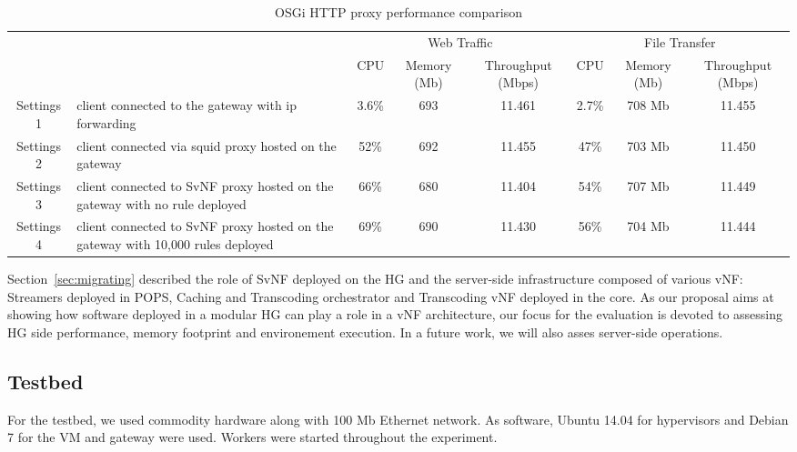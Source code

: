 \begin{table*}
	\centering
	\begin{tabular}{| c | p{}|c |c |c || c |c |c |}
	
	
 	    \multicolumn{2}{c}{} & \multicolumn{3}{c}{Web Traffic} 		  & \multicolumn{3}{c}{File Transfer} \\
 	     \cline{3-8}	
             \multicolumn{2}{c|}{} & CPU 			& Memory (Mb) 		& Throughput (Mbps)	& CPU 		& Memory (Mb)		& Throughput (Mbps) \\\hline   
Settings 1 & client connected to the gateway with ip forwarding &   3.6\% 		& 693 		& 11.461		& 2.7\%		& 708 Mb		& 11.455 \\\hline
Settings 2 & client connected via squid proxy hosted on the gateway   &   52\%        & 692 		& 11.455		& 47\%		& 703 Mb		& 11.450 \\\hline
Settings 3 & client connected to SvNF proxy hosted on the gateway with no rule deployed &   66\%		& 680 		& 11.404		& 54\%		& 707 Mb		& 11.449 \\\hline
Settings 4 & client connected to SvNF proxy hosted on the gateway with 10,000 rules deployed   &   69\%        & 690 		& 11.430		& 56\%		& 704 Mb		& 11.444 \\\hline

	
	
	            
	\end{tabular}
	\caption{
	OSGi HTTP proxy performance comparison
	\label{tab:perf-comparison}
	}
	
\end{table*}

Section~\ref{sec:migrating} described the role of SvNF deployed on the HG and the server-side infrastructure composed of various vNF: Streamers deployed in POPS, Caching and Transcoding orchestrator and Transcoding vNF deployed in the core.
As our proposal aims at showing how software deployed in a modular HG can play a role in a vNF architecture, our focus for the evaluation is devoted to assessing HG side performance, memory footprint and environement execution. In a future work, we will also asses server-side operations.


\subsection{Testbed }\label{Testbed}

For the testbed, we used commodity hardware along with 100 Mb Ethernet network. As software, Ubuntu 14.04 for hypervisors and Debian 7 for the VM and gateway were used. Workers were started throughout the experiment.
  
